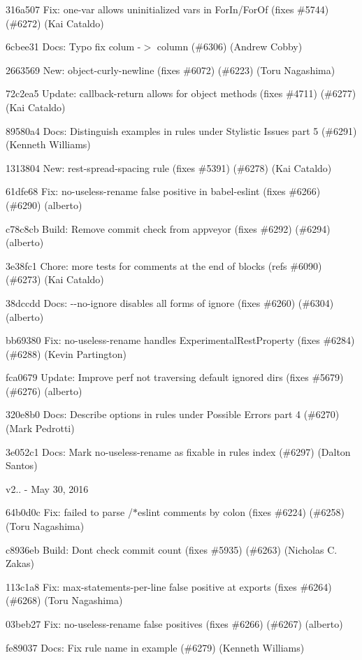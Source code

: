 \begin{DoxyItemize}
\item 316a507 Fix\+: one-\/var allows uninitialized vars in For\+In/\+For\+Of (fixes \#5744) (\#6272) (Kai Cataldo)
\item 6cbee31 Docs\+: Typo fix \textquotesingle{}colum\textquotesingle{} -\/$>$ \textquotesingle{}column\textquotesingle{} (\#6306) (Andrew Cobby)
\item 2663569 New\+: {\ttfamily object-\/curly-\/newline} (fixes \#6072) (\#6223) (Toru Nagashima)
\item 72c2ea5 Update\+: callback-\/return allows for object methods (fixes \#4711) (\#6277) (Kai Cataldo)
\item 89580a4 Docs\+: Distinguish examples in rules under Stylistic Issues part 5 (\#6291) (Kenneth Williams)
\item 1313804 New\+: rest-\/spread-\/spacing rule (fixes \#5391) (\#6278) (Kai Cataldo)
\item 61dfe68 Fix\+: {\ttfamily no-\/useless-\/rename} false positive in babel-\/eslint (fixes \#6266) (\#6290) (alberto)
\item c78c8cb Build\+: Remove commit check from appveyor (fixes \#6292) (\#6294) (alberto)
\item 3e38fc1 Chore\+: more tests for comments at the end of blocks (refs \#6090) (\#6273) (Kai Cataldo)
\item 38dccdd Docs\+: {\ttfamily -\/-\/no-\/ignore} disables all forms of ignore (fixes \#6260) (\#6304) (alberto)
\item bb69380 Fix\+: no-\/useless-\/rename handles Experimental\+Rest\+Property (fixes \#6284) (\#6288) (Kevin Partington)
\item fca0679 Update\+: Improve perf not traversing default ignored dirs (fixes \#5679) (\#6276) (alberto)
\item 320e8b0 Docs\+: Describe options in rules under Possible Errors part 4 (\#6270) (Mark Pedrotti)
\item 3e052c1 Docs\+: Mark no-\/useless-\/rename as fixable in rules index (\#6297) (Dalton Santos)
\end{DoxyItemize}

v2.. -\/ May 30, 2016


\begin{DoxyItemize}
\item 64b0d0c Fix\+: failed to parse {\ttfamily /$\ast$eslint} comments by colon (fixes \#6224) (\#6258) (Toru Nagashima)
\item c8936eb Build\+: Don\textquotesingle{}t check commit count (fixes \#5935) (\#6263) (Nicholas C. Zakas)
\item 113c1a8 Fix\+: {\ttfamily max-\/statements-\/per-\/line} false positive at exports (fixes \#6264) (\#6268) (Toru Nagashima)
\item 03beb27 Fix\+: {\ttfamily no-\/useless-\/rename} false positives (fixes \#6266) (\#6267) (alberto)
\item fe89037 Docs\+: Fix rule name in example (\#6279) (Kenneth Williams)
\end{DoxyItemize}


